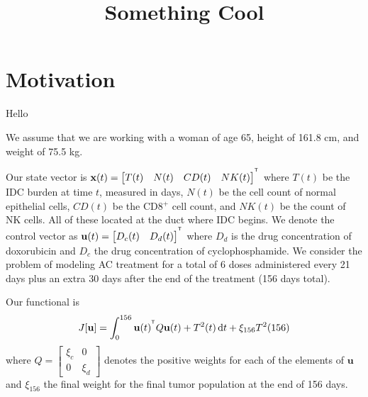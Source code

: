 \documentclass[12pt]{article}
\begin{document}
\title{Something Cool}
\date{\vspace{-9ex}}
\maketitle
\section{Motivation}
Hello

We assume that we are working with a woman of age 65, height of 161.8 cm, and weight of 75.5 kg.

Our state vector is $\mathbf{x}(t) = \begin{bmatrix} T(t) & N(t) & CD(t) & NK(t) \end{bmatrix}^{^{\mathsf T}}$ where $T(t)$ be the IDC burden at time $t$, measured in days, $N(t)$ be the cell count of normal epithelial cells, $CD(t)$ be the CD8$^+$ cell count, and $NK(t)$ be the count of NK cells.
 All of these located at the duct where IDC begins. 
We denote the control vector as $\mathbf{u}(t)=\begin{bmatrix} D_c(t) & D_d(t) \end{bmatrix}^{^{\mathsf T}}$ where $D_d$ is the drug concentration of doxorubicin and $D_c$ the drug concentration of cyclophosphamide.
We consider the problem of modeling AC treatment for a total of 6 doses administered every 21 days plus an extra 30 days after the end of the treatment (156 days total).


Our functional is 
\begin{align*}
	J[\mathbf{u}] = \int_0^{156}\mathbf{u}(t)^{^{\mathsf T}} Q \mathbf{u}(t)+ T^2(t) \mathop{}\!\mathrm{d} t + \xi_{156} T^2(156)
\end{align*}
where $Q = \begin{bmatrix} \xi_c & 0 \\ 0 & \xi_d \end{bmatrix}$ denotes the positive weights for each of the elements of $\mathbf{u}$ and $ \xi_{156}$ the final weight for the final tumor population at the end of 156 days. 
\end{document}
